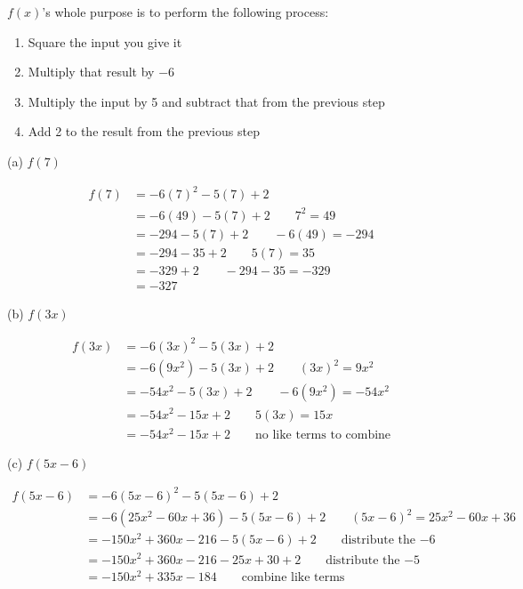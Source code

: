 \begin{solution}
$f(x)$'s whole purpose is to perform the following process:

\begin{enumerate}
    \item Square the input you give it
    \item Multiply that result by $-6$
    \item Multiply the input by 5 and subtract that from the previous step
    \item Add 2 to the result from the previous step
\end{enumerate}

(a)  $f(7)$

\begin{align*}
    f(7) &= -6(7)^2 - 5(7) + 2 \\
    &= -6(49) - 5(7) + 2 \qquad 7^2 = 49 \\
    &= -294 - 5(7) + 2 \qquad -6(49) = -294 \\
    &= -294 - 35 + 2 \qquad 5(7) = 35 \\
    &= -329 + 2 \qquad -294-35 = -329 \\
    &= -327
\end{align*}

(b)  $f(3x)$

\begin{align*}
    f(3x) &= -6(3x)^2 - 5(3x) + 2 \\
    &= -6(9x^2) - 5(3x) + 2 \qquad (3x)^2 = 9x^2 \\
    &= -54x^2 - 5(3x) + 2 \qquad -6(9x^2) = -54x^2 \\
    &= -54x^2 - 15x + 2 \qquad 5(3x) = 15x \\
    &= -54x^2 - 15x + 2 \qquad \text{no like terms to combine} 
\end{align*}

(c)  $f(5x-6)$

\begin{align*}
    f(5x-6) &= -6(5x-6)^2 - 5(5x-6) + 2 \\ 
    &= -6(25x^2 - 60x + 36) - 5(5x-6) + 2 \qquad (5x-6)^2 = 25x^2 - 60x + 36 \\
    &= -150x^2 + 360x - 216 - 5(5x-6) + 2 \qquad \text{distribute the $-6$} \\
    &= -150x^2 + 360x - 216 - 25x + 30 + 2 \qquad \text{distribute the $-5$} \\
    &= -150x^2 + 335x - 184 \qquad \text{combine like terms}
\end{align*}
\end{solution}

